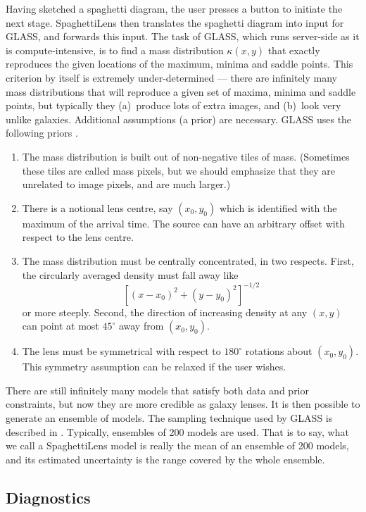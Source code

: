 \documentclass[usenatbib]{mn2e}
\newcommand{\spl}{SpaghettiLens\xspace}
\begin{document}
Having sketched a spaghetti diagram, the user presses a button to
initiate the next stage.  \spl then translates the spaghetti diagram
into input for GLASS, and forwards this input.  The task of GLASS,
which runs server-side as it is compute-intensive, is to find a mass
distribution $\kappa(x,y)$ that exactly reproduces the given locations
of the maximum, minima and saddle points. This criterion by itself is
extremely under-determined --- there are infinitely many mass
distributions that will reproduce a given set of maxima, minima and
saddle points, but typically they (a)~produce lots of extra images,
and (b)~look very unlike galaxies.  Additional assumptions (a prior)
are necessary.  GLASS uses the following priors
\citep[cf.][]{1997MNRAS.292..148S,2008ApJ...679...17C}.
\begin{enumerate}
\item The mass distribution is built out of non-negative tiles of
  mass.  (Sometimes these tiles are called mass pixels, but we should
  emphasize that they are unrelated to image pixels, and are much
  larger.)
\item There is a notional lens centre, say $(x_0,y_0)$ which is
  identified with the maximum of the arrival time.  The source can
  have an arbitrary offset with respect to the lens centre.
\item The mass distribution must be centrally concentrated, in two
  respects.  First, the circularly averaged density must fall away
  like $$ \left[(x-x_0)^2+(y-y_0)^2\right]^{-1/2}$$ or more steeply.
  Second, the direction of increasing density at any $(x,y)$ can point
  at most $45^\circ$ away from $(x_0,y_0)$.
\item The lens must be symmetrical with respect to $180^\circ$ rotations
  about $(x_0,y_0)$.  This symmetry assumption can be relaxed if the
  user wishes.
\end{enumerate}
There are still infinitely many models that satisfy both data and
prior constraints, but now they are more credible as galaxy lenses.
It is then possible to generate an ensemble of models.  The sampling
technique used by GLASS is described in \citep{Lubini2012}.
Typically, ensembles of 200 models are used.  That is to say, what we
call a \spl model is really the mean of an ensemble of 200 models, and
its estimated uncertainty is the range covered by the whole ensemble.



\subsection{Diagnostics}
\label{sec:diag}
\end{document}
